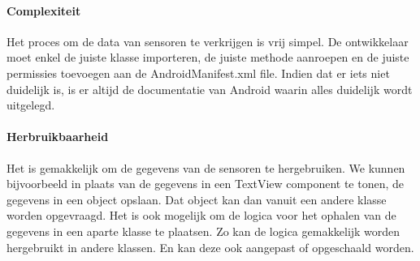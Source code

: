 \paragraph{Complexiteit}
Het proces om de data van sensoren te verkrijgen is vrij simpel. De ontwikkelaar moet enkel de juiste klasse importeren, 
de juiste methode aanroepen en de juiste permissies toevoegen aan de AndroidManifest.xml file. Indien dat er iets niet 
duidelijk is, is er altijd de documentatie van Android waarin alles duidelijk wordt uitgelegd.

\paragraph{Herbruikbaarheid}
Het is gemakkelijk om de gegevens van de sensoren te hergebruiken. We kunnen bijvoorbeeld in plaats van de 
gegevens in een TextView component te tonen, de gegevens in een object opslaan. Dat object kan dan vanuit 
een andere klasse worden opgevraagd. Het is ook mogelijk om de logica voor het ophalen van de gegevens
in een aparte klasse te plaatsen. Zo kan de logica gemakkelijk worden hergebruikt in andere klassen. 
En kan deze ook aangepast of opgeschaald worden.
